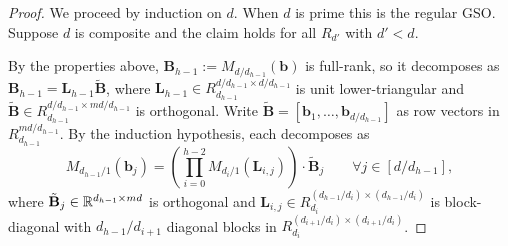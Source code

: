 \begin{proof}
	We proceed by induction on $d$. When $d$ is prime this is the regular GSO. Suppose $d$ is composite and the claim holds for all $R_{d'}$ with $d' < d$.

	By the properties above, $\mathbf{B}_{h-1} := M_{d/d_{h-1}}(\mathbf{b})$ is full-rank, so it decomposes as $\mathbf{B}_{h-1} = \mathbf{L}_{h-1} \tilde{\mathbf{B}}$, where $\mathbf{L}_{h-1} \in R_{d_{h-1}}^{d/d_{h-1} \times d/d_{h-1}}$ is unit lower-triangular and $\tilde{\mathbf{B}} \in R_{d_{h-1}}^{d/d_{h-1} \times md/d_{h-1}}$ is orthogonal. Write $\tilde{\mathbf{B}} = [\mathbf{b}_1, \dots, \mathbf{b}_{d/d_{h-1}}]$ as row vectors in $R_{d_{h-1}}^{md/d_{h-1}}$. By the induction hypothesis, each decomposes as
	\[
		M_{d_{h-1}/1}(\mathbf{b}_j) = \left( \prod_{i=0}^{h-2} M_{d_i/1}(\mathbf{L}_{i,j}) \right) \cdot \tilde{\mathbf{B}}_j \qquad \forall j \in [d/d_{h-1}],
	\]
	where $\tilde{\mathbf{B}}_j \in \mathbb{R}^{d_{h-1} \times md}$ is orthogonal and $\mathbf{L}_{i,j} \in R_{d_i}^{(d_{h-1}/d_i) \times (d_{h-1}/d_i)}$ is block-diagonal with $d_{h-1}/d_{i+1}$ diagonal blocks in $R_{d_i}^{(d_{i+1}/d_i) \times (d_{i+1}/d_i)}$.


\end{proof}
